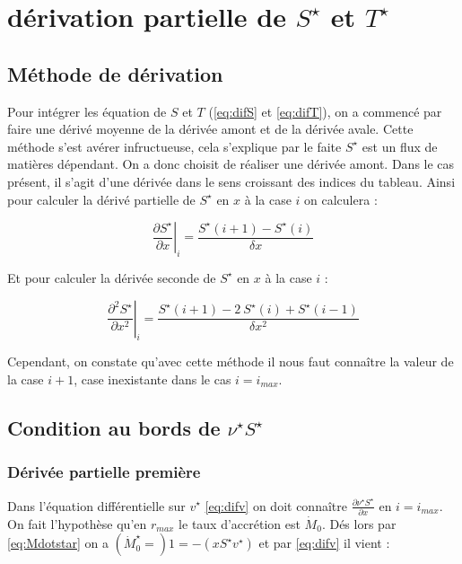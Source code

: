 \section{dérivation partielle  de $S^{\star}$ et $T^{\star}$}

\subsection{Méthode de dérivation}

Pour intégrer les équation de $S$ et $T$ (\eqref{eq:difS} et \eqref{eq:difT}), on a commencé par faire une dérivé moyenne de la dérivée amont et de la dérivée avale. Cette méthode s'est avérer infructueuse, cela s'explique par le faite $S^{\star}$ est un flux de matières dépendant. On a donc choisit de réaliser une dérivée amont. Dans le cas présent, il s'agit d'une dérivée dans le sens croissant des indices du tableau. Ainsi pour calculer la dérivé partielle de $S^{\star}$ en $x$ à la case $i$ on calculera :

\begin{equation}
  \left. \frac{\partial S^{\star}}{\partial x} \right|_i = \frac{S^{\star}(i+1)-S^{\star}(i)}{\delta x} 
\end{equation}

Et pour calculer la dérivée seconde de $S^{\star}$ en $x$ à la case $i$ :

\begin{equation}
  \left. \frac{\partial^2 S^{\star}}{\partial x^2}\right|_i=\frac{S^{\star}(i+1)-2\ S^{\star}(i) +S^{\star}(i-1)}{\delta x^2} 
\end{equation}

Cependant, on constate qu'avec cette méthode il nous faut connaître la valeur de la case $i+1$, case inexistante dans le cas $i=i_{max}$.

\subsection{Condition au bords de $\nu^{\star}S^{\star}$}

\subsubsection{Dérivée partielle première}

Dans l'équation différentielle sur $v^{\star}$ \eqref{eq:difv} on doit connaître $\frac{\partial \nu^{\star} S^{\star}}{\partial x}$ en $i=i_{max}$.
On fait l'hypothèse qu'en $r_{max}$ le taux d'accrétion est $\dot{M}_0$. Dés lors par \eqref{eq:Mdotstar} on a $(\dot{M}^{\star}_0=)1 = -(x S^{\star}v^{\star})$ et par \eqref{eq:difv} il vient :

